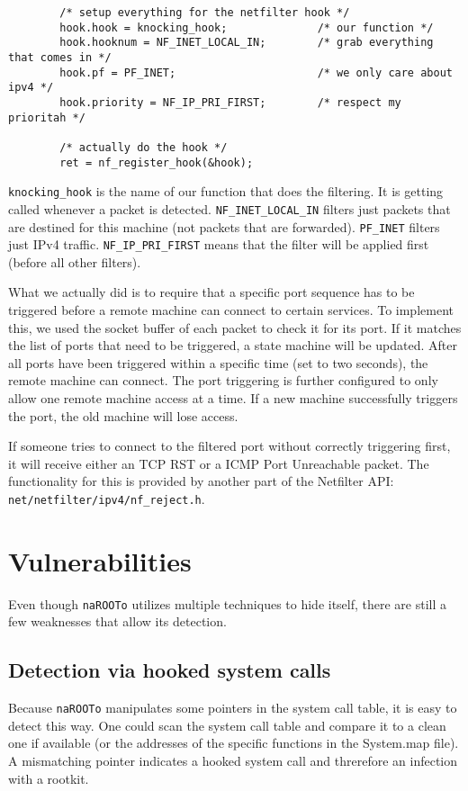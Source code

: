 \documentclass[10pt, letterpaper]{scrartcl}
\begin{document}
\begin{verbatim}
        /* setup everything for the netfilter hook */
        hook.hook = knocking_hook;              /* our function */
        hook.hooknum = NF_INET_LOCAL_IN;        /* grab everything that comes in */
        hook.pf = PF_INET;                      /* we only care about ipv4 */
        hook.priority = NF_IP_PRI_FIRST;        /* respect my prioritah */

        /* actually do the hook */
        ret = nf_register_hook(&hook);
\end{verbatim} 

\texttt{knocking\_hook} is the name of our function that does the filtering. It is getting called whenever a packet is detected. \texttt{NF\_INET\_LOCAL\_IN} filters just packets that are destined for this machine (not packets that are forwarded). \texttt{PF\_INET} filters just IPv4 traffic. \texttt{NF\_IP\_PRI\_FIRST} means that the filter will be applied first (before all other filters).

What we actually did is to require that a specific port sequence has to be triggered before a remote machine can connect to certain services.
To implement this, we used the socket buffer of each packet to check it for its port.
If it matches the list of ports that need to be triggered, a state machine will be updated.
After all ports have been triggered within a specific time (set to two seconds), the remote machine can connect.
The port triggering is further configured to only allow one remote machine access at a time.
If a new machine successfully triggers the port, the old machine will lose access.

If someone tries to connect to the filtered port without correctly triggering first, it will receive either an TCP RST or a ICMP Port Unreachable packet.
The functionality for this is provided by another part of the Netfilter API: \texttt{net/netfilter/ipv4/nf\_reject.h}.

\section{Vulnerabilities}\label{sec:vulnerabilities}
Even though \texttt{naROOTo} utilizes multiple techniques to hide itself, there are still a few weaknesses that allow its detection.

\subsection{Detection via hooked system calls}
Because \texttt{naROOTo} manipulates some pointers in the system call table, it is easy to detect this way.
One could scan the system call table and compare it to a clean one if available (or the addresses of the specific functions in the System.map file).
A mismatching pointer indicates a hooked system call and threrefore an infection with a rootkit.
\end{document}
